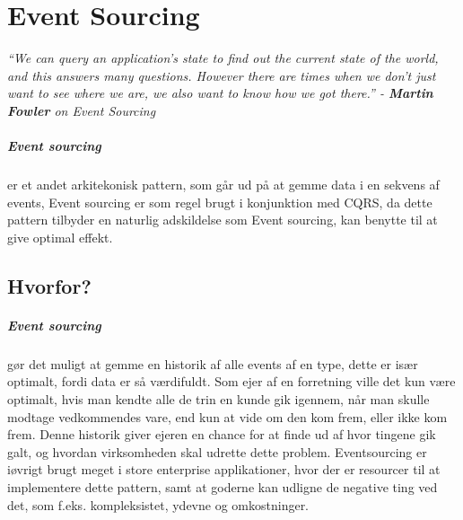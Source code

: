 \chapter{Event Sourcing}

\textit{``We can query an application's state to find out the current state of the world, and this answers many questions. However there are times when we don't just want to see where we are, we also want to know how we got there.'' - \textbf{Martin Fowler} on Event Sourcing}

\paragraph{Event sourcing}
  
er et andet arkitekonisk pattern, som går ud på at gemme data i en sekvens af events, Event sourcing er som regel brugt i konjunktion med CQRS, da dette pattern tilbyder en naturlig adskildelse som Event sourcing, kan benytte til at give optimal effekt.

\section{Hvorfor?}

\paragraph{Event sourcing} gør det muligt at gemme en historik af alle events af en type, dette er især optimalt, fordi data er så værdifuldt. Som ejer af en forretning ville det kun være optimalt, hvis man kendte alle de trin en kunde gik igennem, når man skulle modtage vedkommendes vare, end kun at vide om den kom frem, eller ikke kom frem. Denne historik giver ejeren en chance for at finde ud af hvor tingene gik galt, og hvordan virksomheden skal udrette dette problem. Eventsourcing er iøvrigt brugt meget i store enterprise applikationer, hvor der er resourcer til at implementere dette pattern, samt at goderne kan udligne de negative ting ved det, som f.eks. kompleksistet, ydevne og omkostninger.

